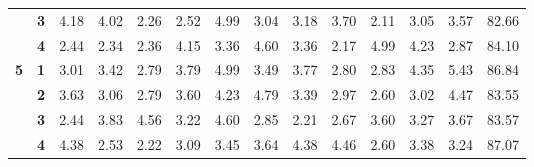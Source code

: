 \begin{table}[h!]
{\begin{tabular}{@{} ccrrrrrrrrrrrr}
\textbf{}   & \textbf{3}                     & 4.18                             & 4.02                             & 2.26                             & 2.52                             & 4.99                             & 3.04                             & 3.18                             & 3.70                             & 2.11                             & 3.05                             & 3.57                            & 82.66                              \\
\textbf{}   & \textbf{4}                     & 2.44                             & 2.34                             & 2.36                             & 4.15                             & 3.36                             & 4.60                             & 3.36                             & 2.17                             & 4.99                             & 4.23                             & 2.87                            & 84.10                              \\
\textbf{5}  & \textbf{1}                     & 3.01                             & 3.42                             & 2.79                             & 3.79                             & 4.99                             & 3.49                             & 3.77                             & 2.80                             & 2.83                             & 4.35                             & 5.43                            & 86.84                              \\
\textbf{}   & \textbf{2}                     & 3.63                             & 3.06                             & 2.79                             & 3.60                             & 4.23                             & 4.79                             & 3.39                             & 2.97                             & 2.60                             & 3.02                             & 4.47                            & 83.55                              \\
\textbf{}   & \textbf{3}                     & 2.44                             & 3.83                             & 4.56                             & 3.22                             & 4.60                             & 2.85                             & 2.21                             & 2.67                             & 3.60                             & 3.27                             & 3.67                            & 83.57                              \\
\textbf{}   & \textbf{4}                     & 4.38                             & 2.53                             & 2.22                             & 3.09                             & 3.45                             & 3.64                             & 4.38                             & 4.46                             & 2.60                             & 3.38                             & 3.24                            & 87.07                              \\

\end{tabular}}
\end{table}
